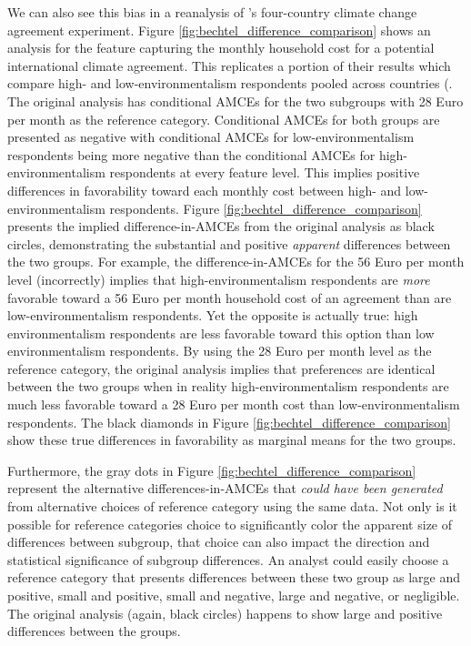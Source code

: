 \documentclass[a4paper,12pt]{article}\usepackage[]{graphicx}\usepackage[]{color}
\begin{document}
We can also see this bias in a reanalysis of \citeauthor{BechtelScheve2013}'s four-country climate change agreement experiment. Figure \ref{fig:bechtel_difference_comparison} shows an analysis for the feature capturing the monthly household cost for a potential international climate agreement. This replicates a portion of their results which compare high- and low-environmentalism respondents pooled across countries (\citet[13767 figure 4]{BechtelScheve2013}. The original analysis has conditional AMCEs for the two subgroups with 28 Euro per month as the reference category. Conditional AMCEs for both groups are presented as negative with conditional AMCEs for low-environmentalism respondents being more negative than the conditional AMCEs for high-environmentalism respondents at every feature level. This implies positive differences in favorability toward each monthly cost between high- and low-environmentalism respondents. Figure \ref{fig:bechtel_difference_comparison} presents the implied difference-in-AMCEs from the original analysis as black circles, demonstrating the substantial and positive \textit{apparent} differences between the two groups. For example, the difference-in-AMCEs for the 56 Euro per month level (incorrectly) implies that high-environmentalism respondents are \textit{more} favorable toward a 56 Euro per month household cost of an agreement than are low-environmentalism respondents. Yet the opposite is actually true: high environmentalism respondents are less favorable toward this option than low environmentalism respondents. By using the 28 Euro per month level as the reference category, the original analysis implies that preferences are identical between the two groups when in reality high-environmentalism respondents are much less favorable toward a 28 Euro per month cost than low-environmentalism respondents. The black diamonds in Figure \ref{fig:bechtel_difference_comparison} show these true differences in favorability as marginal means for the two groups.

Furthermore, the gray dots in Figure \ref{fig:bechtel_difference_comparison} represent the alternative differences-in-AMCEs that \textit{could have been generated} from alternative choices of reference category using the same data. Not only is it possible for reference categories choice to significantly color the apparent size of differences between subgroup, that choice can also impact the direction and statistical significance of subgroup differences. An analyst could easily choose a reference category that presents differences between these two group as large and positive, small and positive, small and negative, large and negative, or negligible. The original analysis (again, black circles) happens to show large and positive differences between the groups.
\end{document}
